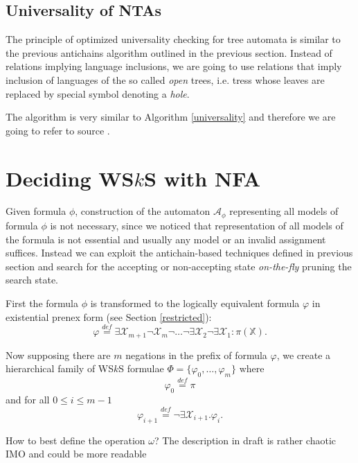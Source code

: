 \subsection{Universality of NTAs}

The principle of optimized universality checking for tree automata is similar to
the previous antichains algorithm outlined in the previous section. Instead of
relations implying language inclusions, we are going to use relations that imply
inclusion of languages of the so called \emph{open} trees, i.e. tress whose
leaves are replaced by special symbol denoting a \emph{hole}.

The algorithm is very similar to Algorithm \ref{universality} and therefore we
are going to refer to source \cite{tacas}.

\section{Deciding WS$k$S with NFA}

Given formula $\phi$, construction of the automaton $\mathcal{A}_\phi$
representing all models of formula $\phi$ is not necessary, since
we noticed that representation of all models of the formula is not essential and
usually any model or an invalid assignment suffices.
Instead we can exploit the antichain-based techniques defined in previous
section and search for the accepting or non-accepting state \emph{on-the-fly}
pruning the search state.

First the formula $\phi$ is transformed to the logically equivalent formula
$\varphi$ in existential prenex form (see Section \ref{restricted}):
\begin{equation*}
 \varphi \overset{\mathit{def}}{=}
 \exists\mathcal{X}_{m+1}\neg\mathcal{X}_m\neg\ldots\neg\exists\mathcal{X}_2\neg\exists\mathcal{X}_1
 :
 \pi(\mathbb{X}).
\end{equation*}

Now supposing there are $m$	negations in the prefix of formula $\varphi$, we
create a hierarchical family of WS$k$S formulae $\Phi = \{\varphi_0,\ldots,\varphi_m\}$
where
\begin{equation}
  \varphi_0 \overset{\mathit{def}}{=} \pi
\end{equation}
and for all $0 \leq i \leq m-1$
\begin{equation}
 \varphi_{i+1} \overset{\mathit{def}}{=} \neg\exists\mathcal{X}_{i+1}.
 \varphi_i.
\end{equation}

{\color{red} How to best define the operation $\omega$? The description in draft
is rather chaotic IMO and could be more readable}

